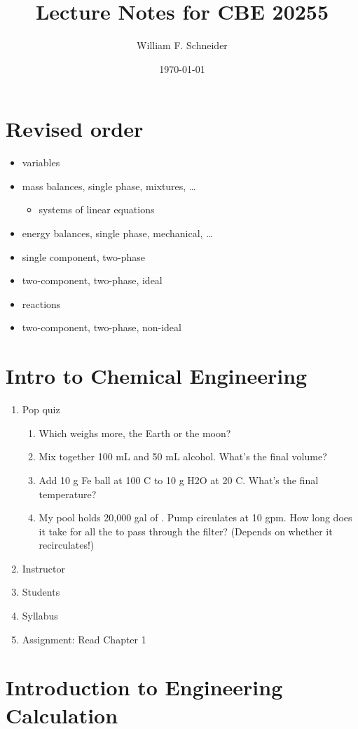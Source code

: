 \documentclass[11pt]{article}
\author{William F. Schneider}
\date{\today}
\title{Lecture Notes for CBE 20255}
\begin{document}
\tableofcontents

\begin{options}
\end{options}

\section{Revised order}
\label{sec-1}
\begin{itemize}
\item variables
\item mass balances, single phase, mixtures, \ldots{}
\begin{itemize}
\item systems of linear equations
\end{itemize}
\item energy balances, single phase, mechanical, \ldots{}
\item single component, two-phase
\item two-component, two-phase, ideal
\item reactions
\item two-component, two-phase, non-ideal
\end{itemize}

\section{Intro to Chemical Engineering}
\label{sec-2}
\begin{enumerate}
\item Pop quiz
\begin{enumerate}
\item Which weighs more, the Earth or the moon?
\item Mix together 100 mL  and 50 mL alcohol.  What's the final volume?
\item Add 10 g Fe ball at 100 C to 10 g H2O at 20 C.  What's the final temperature?
\item My pool holds 20,000 gal of .  Pump circulates at 10 gpm.  How
long does it take for all the  to pass through the filter?
(Depends on whether it recirculates!)
\end{enumerate}
\item Instructor
\item Students
\item Syllabus
\item Assignment: Read Chapter 1
\end{enumerate}
\section{Introduction to Engineering Calculation}
\label{sec-3}
\end{document}
